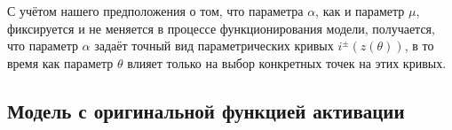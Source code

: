 С учётом нашего предположения о том, что параметра $\alpha$, как и параметр $\mu$, фиксируется и не меняется в процессе функционирования модели, получается, что параметр $\alpha$ задаёт точный вид параметрических кривых $i^{\pm}(z(\theta))$, в то время как параметр $\theta$ влияет только на выбор конкретных точек на этих кривых.


\subsection{Модель с оригинальной функцией активации}  \label{subsection:analysis_origin}

